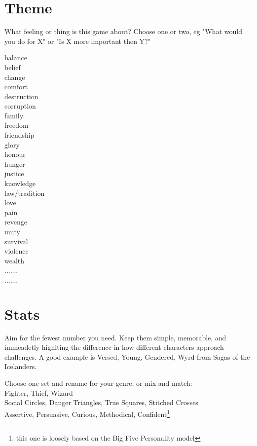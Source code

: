 \documentclass{tufte-handout}
\begin{document}
\section{Theme}
What feeling or thing is this game about?
Choose one or two, eg
"What would you do for X"
or
"Is X more important then Y?"

\begin{multicols}{3}
balance\\
belief\\
change\\
comfort\\
destruction \\
corruption\\
family \\
freedom\\
friendship\\
glory\\
honour\\
hunger\\
justice\\
knowledge \\
law/tradition\\
love\\
pain\\
revenge\\
unity\\
survival\\
violence\\
wealth\\
.......\\
.......\\
\end{multicols}

\section{Stats}
Aim for the fewest number you need. Keep them simple, memorable, and immeadetly highlting the difference in how different characters approach challenges. A good example is Versed, Young, Gendered, Wyrd from Sagas of the Icelanders.

Choose one set and rename for your genre, or mix and match:\\

Fighter, Thief, Wizard\\
Social Circles, Danger Triangles, True Squares, Stitched Crosses \\
Assertive, Persuasive, Curious, Methodical, Confident\footnote{this one is loosely based on the Big Five Personality model}\\
\end{document}
